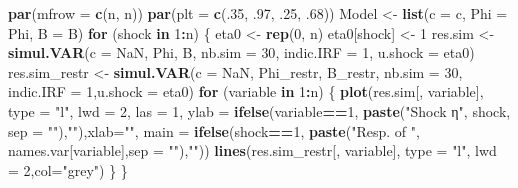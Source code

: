 \documentclass[
  12pt,
]{book}
\newenvironment{Shaded}{\begin{snugshade}}{\end{snugshade}}
\newcommand{\AttributeTok}[1]{\textcolor[rgb]{0.13,0.29,0.53}{#1}}
\newcommand{\ConstantTok}[1]{\textcolor[rgb]{0.56,0.35,0.01}{#1}}
\newcommand{\ControlFlowTok}[1]{\textcolor[rgb]{0.13,0.29,0.53}{\textbf{#1}}}
\newcommand{\DecValTok}[1]{\textcolor[rgb]{0.00,0.00,0.81}{#1}}
\newcommand{\FunctionTok}[1]{\textcolor[rgb]{0.13,0.29,0.53}{\textbf{#1}}}
\newcommand{\NormalTok}[1]{#1}
\newcommand{\OtherTok}[1]{\textcolor[rgb]{0.56,0.35,0.01}{#1}}
\newcommand{\SpecialCharTok}[1]{\textcolor[rgb]{0.81,0.36,0.00}{\textbf{#1}}}
\newcommand{\StringTok}[1]{\textcolor[rgb]{0.31,0.60,0.02}{#1}}
\theoremstyle{definition}
\theoremstyle{definition}
\theoremstyle{definition}
\theoremstyle{definition}
\theoremstyle{remark}
\begin{document}
\begin{Shaded}
\begin{Highlighting}[]
\FunctionTok{par}\NormalTok{(}\AttributeTok{mfrow =} \FunctionTok{c}\NormalTok{(n, n))}
\FunctionTok{par}\NormalTok{(}\AttributeTok{plt =} \FunctionTok{c}\NormalTok{(.}\DecValTok{35}\NormalTok{, .}\DecValTok{97}\NormalTok{, .}\DecValTok{25}\NormalTok{, .}\DecValTok{68}\NormalTok{))}
\NormalTok{Model }\OtherTok{\textless{}{-}} \FunctionTok{list}\NormalTok{(}\AttributeTok{c =}\NormalTok{ c, }\AttributeTok{Phi =}\NormalTok{ Phi, }\AttributeTok{B =}\NormalTok{ B)}
\ControlFlowTok{for}\NormalTok{ (shock }\ControlFlowTok{in} \DecValTok{1}\SpecialCharTok{:}\NormalTok{n) \{}
\NormalTok{  eta0 }\OtherTok{\textless{}{-}} \FunctionTok{rep}\NormalTok{(}\DecValTok{0}\NormalTok{, n)}
\NormalTok{  eta0[shock] }\OtherTok{\textless{}{-}} \DecValTok{1}
\NormalTok{  res.sim }\OtherTok{\textless{}{-}} \FunctionTok{simul.VAR}\NormalTok{(}\AttributeTok{c =} \ConstantTok{NaN}\NormalTok{, Phi, B, }\AttributeTok{nb.sim =} \DecValTok{30}\NormalTok{, }\AttributeTok{indic.IRF =} \DecValTok{1}\NormalTok{,}
                       \AttributeTok{u.shock =}\NormalTok{ eta0)}
\NormalTok{  res.sim\_restr }\OtherTok{\textless{}{-}} \FunctionTok{simul.VAR}\NormalTok{(}\AttributeTok{c =} \ConstantTok{NaN}\NormalTok{, Phi\_restr, B\_restr, }\AttributeTok{nb.sim =} \DecValTok{30}\NormalTok{,}
                             \AttributeTok{indic.IRF =} \DecValTok{1}\NormalTok{,}\AttributeTok{u.shock =}\NormalTok{ eta0)}
  \ControlFlowTok{for}\NormalTok{ (variable }\ControlFlowTok{in} \DecValTok{1}\SpecialCharTok{:}\NormalTok{n) \{}
    \FunctionTok{plot}\NormalTok{(res.sim[, variable], }\AttributeTok{type =} \StringTok{"l"}\NormalTok{, }\AttributeTok{lwd =} \DecValTok{2}\NormalTok{, }\AttributeTok{las =} \DecValTok{1}\NormalTok{,}
         \AttributeTok{ylab =} \FunctionTok{ifelse}\NormalTok{(variable}\SpecialCharTok{==}\DecValTok{1}\NormalTok{,}
                       \FunctionTok{paste}\NormalTok{(}\StringTok{"Shock η"}\NormalTok{, shock, }\AttributeTok{sep =} \StringTok{""}\NormalTok{),}\StringTok{""}\NormalTok{),}\AttributeTok{xlab=}\StringTok{""}\NormalTok{,}
         \AttributeTok{main =} \FunctionTok{ifelse}\NormalTok{(shock}\SpecialCharTok{==}\DecValTok{1}\NormalTok{,}
                       \FunctionTok{paste}\NormalTok{(}\StringTok{"Resp. of "}\NormalTok{, names.var[variable],}\AttributeTok{sep =} \StringTok{""}\NormalTok{),}\StringTok{""}\NormalTok{))}
    \FunctionTok{lines}\NormalTok{(res.sim\_restr[, variable], }\AttributeTok{type =} \StringTok{"l"}\NormalTok{, }\AttributeTok{lwd =} \DecValTok{2}\NormalTok{,}\AttributeTok{col=}\StringTok{"grey"}\NormalTok{)}
\NormalTok{  \}}
\NormalTok{\}}
\end{Highlighting}
\end{Shaded}
\end{document}
